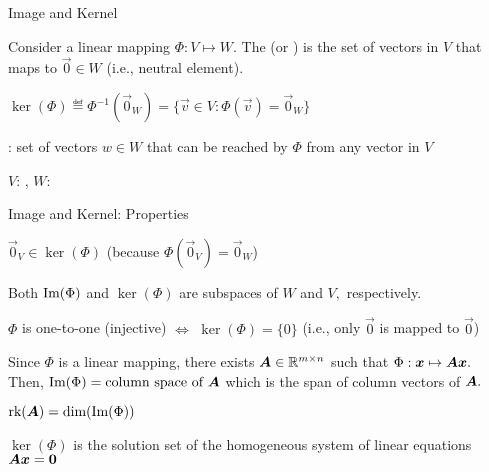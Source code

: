 \documentclass[handout,fleqn,aspectratio=169]{beamer}
\begin{document}
\begin{frame}{Image and Kernel}

\plitemsep 0.1in

\bci 


\item Consider a linear mapping $\Phi: V \mapsto W.$ The  (or ) is the set of vectors in $V$ that maps to $\vec{0} \in W$ (i.e., neutral element).

\medskip
{}  $\ker(\Phi) \eqdef \Phi^{-1}(\vec{0}_W) = \{\vec{v} \in V : \Phi(\vec{v}) = \vec{0}_W \}$

\item {}: set of vectors $w \in W$ that can be reached by $\Phi$ from any vector in $V$

\item $V$: , $W$: 

\centering
{}

\eci

\end{frame}

\begin{frame}{Image and Kernel: Properties}

\plitemsep 0.2in

\bci 

\item $\vec{0}_V \in \ker(\Phi)$ (because $\Phi(\vec{0}_V) = \vec{0}_W$)
\item Both $\text{Im}(\Phi)$ and $\ker(\Phi)$ are subspaces of $W$ and $V,$ respectively. 
\item $\Phi$ is one-to-one (injective) $\Longleftrightarrow$ $\ker(\Phi) = \{0\}$ (i.e., only $\vec{0}$ is mapped to $\vec{0}$)

\item Since $\Phi$ is a linear mapping, there exists $\bm{A} \in {\mathbb R}^{m \times n}$ such that $\Phi: \bm{x} \mapsto \bm{A}\bm{x}.$ Then, $\text{Im}(\Phi) = \text{column space of } \bm{A}$ which is the span of column vectors of $\bm{A}.$

\item $\text{rk}(\bm{A}) = \text{dim}(\text{Im}(\Phi))$

\item $\ker(\Phi)$ is the solution set of the homogeneous system of linear equations $\bm{A}\bm{x} = \bm{0}$
\eci

\end{frame}
\end{document}
